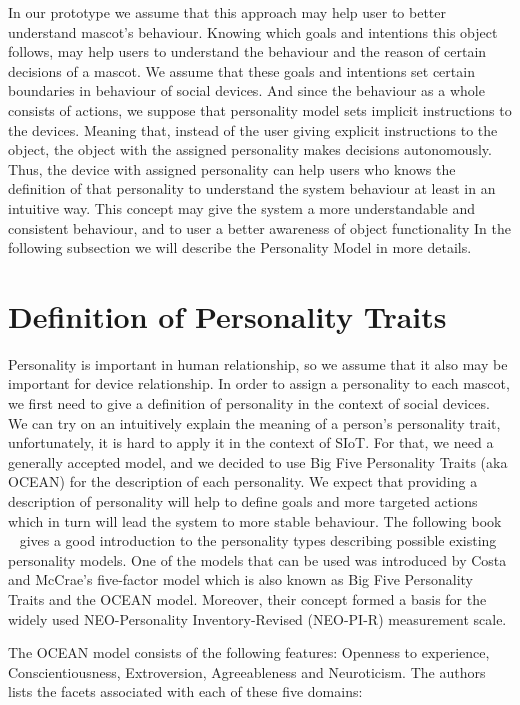 In our prototype we assume that this approach may help user to better understand mascot's behaviour. Knowing which goals and intentions this object follows, may help users to understand the behaviour and the reason of certain decisions of a mascot. We assume that these goals and intentions set certain boundaries in behaviour of social devices. And since the behaviour as a whole consists of actions, we suppose that personality model sets implicit instructions to the devices. Meaning that, instead of the user giving explicit instructions to the object, the object with the assigned personality makes decisions autonomously. Thus, the device with assigned personality can help users who knows the definition of that personality to understand the system behaviour at least in an intuitive way.
This concept may give the system a more understandable and consistent behaviour, and to user a better awareness of object functionality
In the following subsection we will describe the Personality Model in more details.

\section{Definition of Personality Traits}
\label{sec:Definition of Personality Traits}

Personality is important in human relationship, so we assume that it also may be important for device relationship. In order to assign a personality to each mascot, we first need to give a definition of personality in the context of social devices. We can try on an intuitively explain the meaning of a person’s personality trait, unfortunately, it is hard to apply it in the context of SIoT. For that, we need a generally accepted model, and we decided to use Big Five Personality Traits (aka OCEAN) for the description of each personality. We expect that providing a description of personality will help to define goals and more targeted actions which in turn will lead the system to more stable behaviour. The following book ~\cite{matthews2003personality} gives a good introduction to the personality types describing possible existing personality models. One of the models that can be used was introduced by Costa and McCrae’s five-factor model which is also known as Big Five Personality Traits and the OCEAN model. Moreover, their concept formed a basis for the widely used NEO-Personality Inventory-Revised (NEO-PI-R) measurement scale.

\par The OCEAN model consists of the following features: Openness to experience, Conscientiousness, Extroversion, Agreeableness and Neuroticism. The authors lists the facets associated with each of these five domains:

